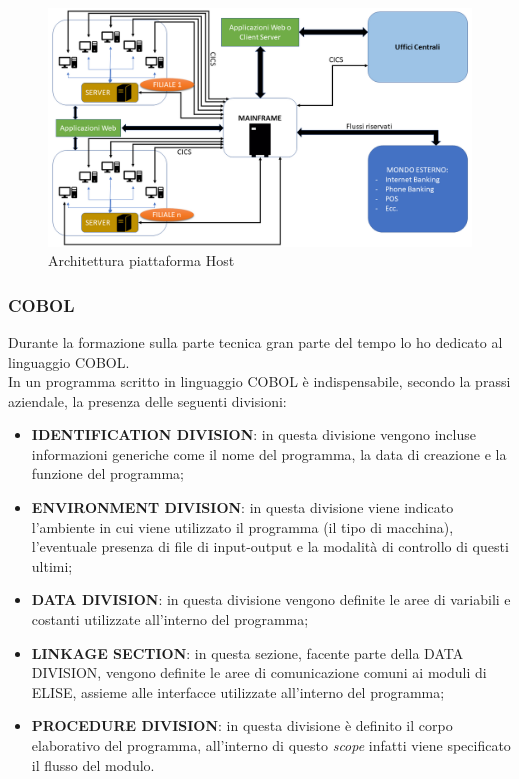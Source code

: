 	\begin{figure}[H]
		\centering
	   	\includegraphics[width=1\textwidth]{immagini/Architettura}
	   	\caption{Architettura piattaforma Host}
	\end{figure}

	
\subsubsection{COBOL}

Durante la formazione sulla parte tecnica gran parte del tempo lo ho dedicato al linguaggio COBOL.\\

In un programma scritto in linguaggio COBOL è indispensabile, secondo la prassi aziendale, la presenza delle seguenti divisioni:
\begin{itemize}

\item \textbf{IDENTIFICATION DIVISION}: in questa divisione vengono incluse informazioni generiche come il nome del programma, la data di creazione e la funzione del programma;

\item \textbf{ENVIRONMENT DIVISION}: in questa divisione viene indicato l'ambiente in cui viene utilizzato il programma (il tipo di macchina), l'eventuale presenza di file di input-output e la modalità di controllo di questi ultimi;

\item \textbf{DATA DIVISION}: in questa divisione vengono definite le aree di variabili e costanti utilizzate all'interno del programma;

\item \textbf{LINKAGE SECTION}: in questa sezione, facente parte della DATA DIVISION, vengono definite le aree di comunicazione comuni ai moduli di ELISE, assieme alle interfacce utilizzate all'interno del programma;

\item \textbf{PROCEDURE DIVISION}: in questa divisione è definito il corpo elaborativo del programma, all'interno di questo \textit{scope} infatti viene specificato il flusso del modulo.
\end{itemize}


